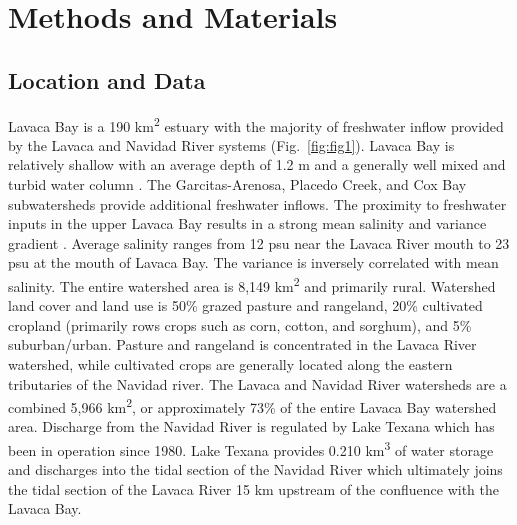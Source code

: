 \documentclass[fleqn,10pt,lineno]{wlpeerj} %
\begin{document}
\hypertarget{methods-and-materials}{%
\section*{Methods and Materials}\label{methods-and-materials}}

\hypertarget{location-and-data}{%
\subsection*{Location and Data}\label{location-and-data}}

Lavaca Bay is a 190 km\textsuperscript{2} estuary with the majority of
freshwater inflow provided by the Lavaca and Navidad River systems
(Fig.~\ref{fig:fig1}). Lavaca Bay is relatively shallow with an average
depth of 1.2 m and a generally well mixed and turbid water column
\autocite{beserespollackLongtermTrendsResponse2011,montagnaAssessmentRelationshipFreshwater2020}.
The Garcitas-Arenosa, Placedo Creek, and Cox Bay subwatersheds provide
additional freshwater inflows. The proximity to freshwater inputs in the
upper Lavaca Bay results in a strong mean salinity and variance gradient
\autocite{montagnaAssessmentRelationshipFreshwater2020}. Average
salinity ranges from 12 psu near the Lavaca River mouth to 23 psu at the
mouth of Lavaca Bay. The variance is inversely correlated with mean
salinity. The entire watershed area is 8,149 km\textsuperscript{2} and
primarily rural. Watershed land cover and land use is 50\% grazed
pasture and rangeland, 20\% cultivated cropland (primarily rows crops
such as corn, cotton, and sorghum), and 5\% suburban/urban. Pasture and
rangeland is concentrated in the Lavaca River watershed, while
cultivated crops are generally located along the eastern tributaries of
the Navidad river. The Lavaca and Navidad River watersheds are a
combined 5,966 km\textsuperscript{2}, or approximately 73\% of the
entire Lavaca Bay watershed area. Discharge from the Navidad River is
regulated by Lake Texana which has been in operation since 1980. Lake
Texana provides 0.210 km\textsuperscript{3} of water storage and
discharges into the tidal section of the Navidad River which ultimately
joins the tidal section of the Lavaca River 15 km upstream of the
confluence with the Lavaca Bay.
\end{document}
